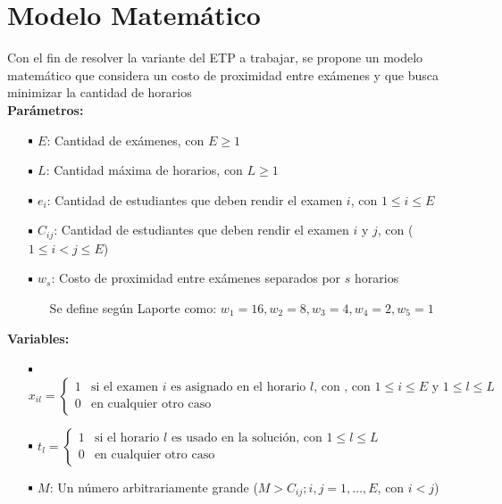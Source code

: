 \documentclass[letter, 10pt]{article}
\newcommand*\sq{\mathbin{\vcenter{\hbox{\rule{.7ex}{.7ex}}}}}
\begin{document}
\section{Modelo Matemático} \label{modelo}

Con el fin de resolver la variante del ETP a trabajar, se propone un modelo matemático que considera un costo de proximidad entre exámenes \cite{LAPORTE1984351} y que busca minimizar la cantidad de horarios \cite{WIJGERS}\\

\textbf{Parámetros:}

\begin{itemize}
	\item[$\sq$] $E$: Cantidad de exámenes, con $E \geq 1$
	\item[$\sq$] $L$: Cantidad máxima de horarios, con $L \geq 1$
	\item[$\sq$] $e_i$: Cantidad de estudiantes que deben rendir el examen $i$, con $1 \leq i \leq E$
	\item[$\sq$] $C_{ij}$: Cantidad de estudiantes que deben rendir el examen $i$ y $j$, con ($1 \leq i < j \leq E$)
	\item[$\sq$] $w_{s}$: Costo de proximidad entre exámenes separados por $s$ horarios
	\begin{itemize}
		\item[] Se define según Laporte \cite{LAPORTE1984351} como: $w_{1} = 16, w_{2} = 8, w_{3} = 4, w_{4} = 2, w_{5} = 1$ 
	\end{itemize}

\end{itemize}

\textbf{Variables:}
\begin{itemize}
	\item[$\sq$] $x_{il} =
					\left\{
						\begin{array}{ll}
							1  & \mbox{si el examen } i \text{ es asignado en el horario } l \text{, con } \text{, con } 1 \leq i \leq E \text{ y } 1 \leq l \leq L \\
							0 & \mbox{en cualquier otro caso}
						\end{array}
					\right.$
	\item[$\sq$] $t_{l} =
					\left\{
						\begin{array}{ll}
							1  & \mbox{si el horario } l \text{ es usado en la solución, con } 1 \leq l \leq L \\
							0 & \mbox{en cualquier otro caso}
						\end{array}
					\right.$

	\item[$\sq$] $M$: Un número arbitrariamente grande ($M > C_{ij}; i, j = 1, \ldots ,E$, con $i < j$)
\end{itemize}
\end{document}
